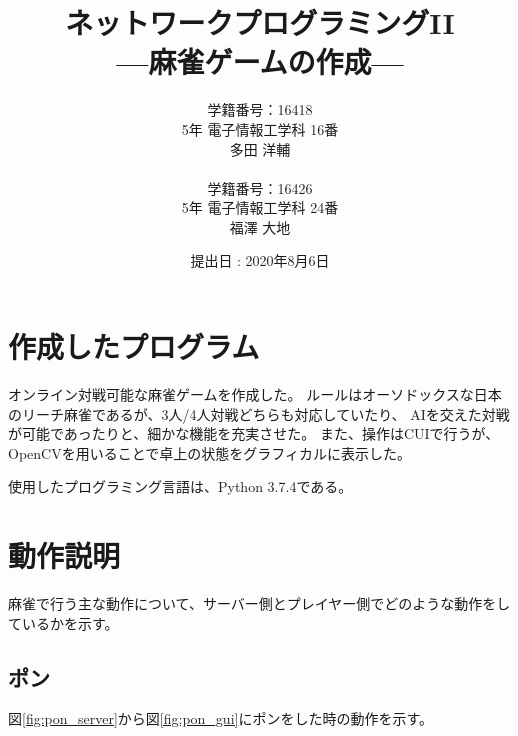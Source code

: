 \documentclass[a4j,titlepage]{jsarticle}
\begin{document}
\begin{titlepage}
  \title{\huge{ネットワークプログラミングI\hspace{-.1em}I} \\ \LARGE{---麻雀ゲームの作成---}}
  \author{
    学籍番号：16418 \\ 5年 電子情報工学科 16番 \\ 多田 洋輔 \\ \\
    学籍番号：16426 \\ 5年 電子情報工学科 24番 \\ 福澤 大地
  }
	\date{提出日 : 2020年8月6日}
  \maketitle
\end{titlepage}


\section{作成したプログラム}
オンライン対戦可能な麻雀ゲームを作成した。
ルールはオーソドックスな日本のリーチ麻雀であるが、3人/4人対戦どちらも対応していたり、
AIを交えた対戦が可能であったりと、細かな機能を充実させた。
また、操作はCUIで行うが、OpenCVを用いることで卓上の状態をグラフィカルに表示した。

使用したプログラミング言語は、Python 3.7.4である。


\section{動作説明}
麻雀で行う主な動作について、サーバー側とプレイヤー側でどのような動作をしているかを示す。

\subsection{ポン}
図\ref{fig:pon_server}から図\ref{fig:pon_gui}にポンをした時の動作を示す。
\end{document}
